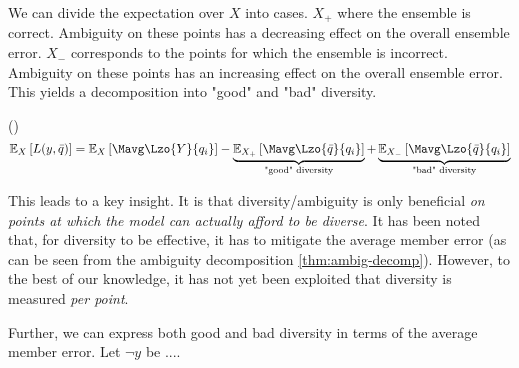 \documentclass[../main.tex]{subfiles}
\begin{document}
We can divide the expectation over $X$ into cases.  $X_{+}$ where the ensemble is correct. Ambiguity on these points has a decreasing effect on the overall ensemble error. $X_{-}$ corresponds to the points for which the ensemble is incorrect. Ambiguity on these points has an increasing effect on the overall ensemble error. This yields a decomposition into "good" and "bad" diversity.

\begin{widepar}
\begin{theorem} (\cite{kuncheva})
$$
\mathbb{E}_{X}\left[   
L(y, \bar{q}) 
\right]
=
\mathbb{E}_{X}\left[    \Mavg \Lzo{Y}{q_{i}}  \right]
- 
\underbrace{
\mathbb{E}_{X_{+}}\left[ \Mavg \Lzo{\bar{q}}{q_{i}} \right]  
}_{\text{"good" diversity}}
+ 
\underbrace{
\mathbb{E}_{X_{-}}\left[ \Mavg \Lzo{\bar{q}}{q_{i}} \right] 
}_{\text{"bad" diversity}}
$$
\end{theorem}
\end{widepar}

This leads to a key insight.
It is that diversity/ambiguity is only beneficial \textit{on points at which the model can actually afford to be diverse}. 
It has been noted that, for diversity to be effective, it has to mitigate the average member error \cite{todo} (as can be seen from the ambiguity decomposition \ref{thm:ambig-decomp}). However, to the best of our knowledge, it has not yet been exploited that diversity is measured \textit{per point}.

Further, we can express both good and bad diversity in terms of the average member error. Let $\neg y$ be ....

\end{document}
